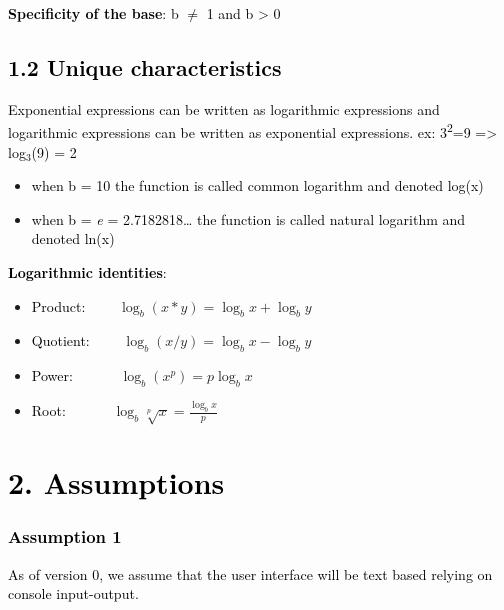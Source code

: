\documentclass[letterpaper]{article}
\providecommand\textsubscript[1]{\ensuremath{{}_{\text{#1}}}}
\newcommand\textstyleHeadingiiiChar[1]{\textrm{\textcolor[rgb]{0.12156863,0.21568628,0.3882353}{#1}}}
\newcommand\liststyleWWNumii{%
\renewcommand\labelitemi{[F0B7?]}
\renewcommand\labelitemii{o}
\renewcommand\labelitemiii{[F0A7?]}
\renewcommand\labelitemiv{[F0B7?]}
}
\newcommand\liststyleWWNumi{%
\renewcommand\labelitemi{[F0B7?]}
\renewcommand\labelitemii{o}
\renewcommand\labelitemiii{[F0A7?]}
\renewcommand\labelitemiv{[F0B7?]}
}
\begin{document}
\textstyleHeadingiiiChar{\textbf{\textcolor{black}{Specificity of the base}}}\textcolor{black}{: b ${\neq}$ 1 and b
{\textgreater} 0}


\bigskip

\subsection[1.2 Unique characteristics]{\textbf{\textcolor{black}{1.2 Unique characteristics}}}
\textcolor{black}{Exponential expressions can be written as logarithmic expressions and logarithmic expressions can be
written as exponential expressions. ex: 3}\textcolor{black}{\textsuperscript{2}}\textcolor{black}{=9 ={\textgreater}
log}\textcolor{black}{\textsubscript{3}}\textcolor{black}{(9) = 2}

\liststyleWWNumii
\begin{itemize}
\item \textcolor{black}{when b = 10 the function is called common logarithm and denoted log(x)}
\item \textcolor{black}{when b = }\textit{\textcolor{black}{e}}\textcolor{black}{ = 2.7182818{\dots} the function is
called natural logarithm and denoted ln(x)}
\end{itemize}
\textstyleHeadingiiiChar{\textbf{\textcolor{black}{Logarithmic identities}}}\textcolor{black}{:}

\liststyleWWNumi
\begin{itemize}
\item \textcolor{black}{Product:\ \ \ \  } $\log _b(x\ast y)=\log _bx+\log _by$
\item \textcolor{black}{Quotient:\ \ \ \  } $\log _b(x/y)=\log _bx-\log _by$
\item \textcolor{black}{Power:\ \ \ \ \ \  } $\log _b(x^p)=p\log _bx$
\item \textcolor{black}{Root:\ \ \ \ \ \  } $\log _b\sqrt[p]x=\frac{\log _bx} p$
\end{itemize}
\section[2. Assumptions]{\textbf{\textcolor{black}{2. Assumptions}}}
\subsubsection[Assumption 1 ]{\textbf{\textcolor{black}{Assumption 1 }}}
\textcolor{black}{As of version 0, we assume that the user interface will be text based relying on console
input-output.}
\end{document}
